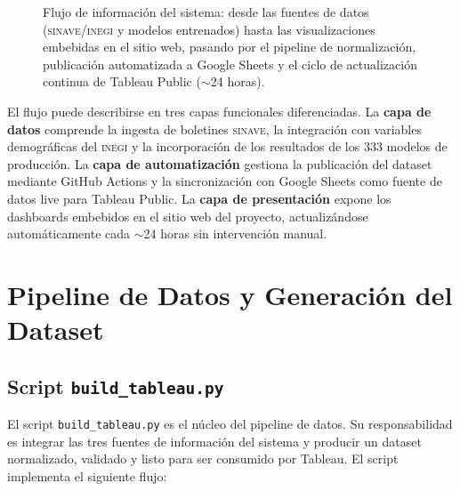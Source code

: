 \documentclass[12pt, letterpaper]{article}
\begin{document}
\begin{figure}[H]
{
}
\caption[Flujo de información del sistema EpiForecast-MX.]{%
Flujo de información del sistema: desde las fuentes de datos (\textsc{sinave}/\textsc{inegi}
y modelos entrenados) hasta las visualizaciones embebidas en el sitio web,
pasando por el pipeline de normalización, publicación automatizada a Google
Sheets y el ciclo de actualización continua de Tableau Public ($\sim$24 horas).}
\label{fig:flujo_tableau}
\end{figure}

El flujo puede describirse en tres capas funcionales diferenciadas. La \textbf{capa de datos} comprende la ingesta de boletines \textsc{sinave}, la integración con variables demográficas del \textsc{inegi} y la incorporación de los resultados de los 333 modelos de producción. La \textbf{capa de automatización} gestiona la publicación del dataset mediante GitHub Actions y la sincronización con Google Sheets como fuente de datos live para Tableau Public. La \textbf{capa de presentación} expone los dashboards embebidos en el sitio web del proyecto, actualizándose automáticamente cada $\sim$24 horas sin intervención manual.

\newpage
\section{Pipeline de Datos y Generación del Dataset}\label{sec:pipeline}

\subsection{Script \texttt{build\_tableau.py}}

El script \texttt{build\_tableau.py} es el núcleo del pipeline de datos. Su responsabilidad es integrar las tres fuentes de información del sistema y producir un dataset normalizado, validado y listo para ser consumido por Tableau. El script implementa el siguiente flujo:
\end{document}
